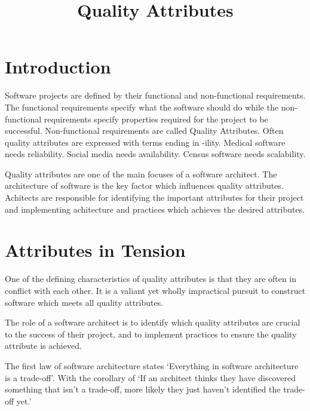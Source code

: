 \title{Quality Attributes}
\maketitle

\section{Introduction}
Software projects are defined by their functional and non-functional requirements.
The functional requirements specify what the software should do while the
non-functional requirements specify properties required for the project to be successful.
Non-functional requirements are called Quality Attributes.
Often quality attributes are expressed with terms ending in -ility.
Medical software needs reliability. Social media needs availability.
Census software needs scalability.

Quality attributes are one of the main focuses of a software architect.
The architecture of software is the key factor which influences quality attributes.
Achitects are responsible for identifying the important attributes for their project
and implementing achitecture and practices which achieves the desired attributes.

\section{Attributes in Tension}
One of the defining characteristics of quality attributes is that they are often in conflict with each other.
It is a valiant yet wholly impractical pursuit to construct software which meets all quality attributes.

The role of a software architect is to identify which quality attributes are crucial to the success of their project,
and to implement practices to ensure the quality attribute is achieved.

The first law of software architecture \cite{richards2020fundamentals} states `Everything in software architecture is a trade-off'.
With the corollary of
`If an architect thinks they have discovered something that isn't a trade-off, more likely they just haven't identified the trade-off yet.'
